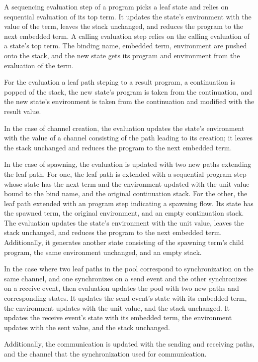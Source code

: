 \documentclass[10pt]{article}
\begin{document}
A sequencing evaluation step of a program picks a leaf state and relies on
sequential evaluation of its top term. It updates the state's environment with the
value of the term, leaves the stack unchanged, and reduces the program to the next
embedded term. A calling evaluation step relies on the calling evaluation of a state's top
term. The binding name, embedded term, environment are pushed onto the stack, and the new
state gets its program and environment from the evaluation of the term. 

For the evaluation a leaf path steping to a result program, a continuation is popped of the
stack, the new state's program is taken from the continuation, and the new state's environment
is taken from the continuation and modified with the result value.

In the case of channel creation, the evaluation updates the state's environment with the
value of a channel consisting of the path leading to its creation; it leaves the stack
unchanged and reduces the program to the next embedded term.

In the case of spawning, the evaluation is updated with two
new paths extending the leaf path.  For one, the leaf path is extended with a sequential
program step whose state has the next term and the environment updated
with the unit value bound to
the bind name, and the original continuation stack. For the other, the leaf path
extended with an program step indicating a spawning flow.  Its state has the spawned
term, the original environment, and an empty continuation stack. 
The evaluation updates the state's environment with the
unit value, leaves the stack unchanged, and reduces the program to the next embedded term.
Additionally, it generates another state consisting of the spawning term's child
program, the same environment unchanged, and an empty stack.

In the case where two leaf paths in the pool correspond to synchronization on the same channel,
and one synchronizes on a send event and the other synchronizes on a receive event, then
evaluation updates the pool with two new paths and corresponding states.
It updates the send event's state with its embedded term, the environment updates with the unit
value, and the stack unchanged.  It updates the receive event's state with its embedded term, the
environment updates with the sent value, and the stack unchanged.

Additionally, the communication is updated with the sending and receiving paths, and the channel
that the synchronization used for communication. 
\end{document}
